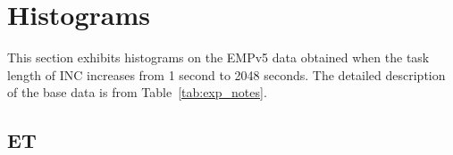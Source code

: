 \section{Histograms~\label{sec:sodb9_hist}} 
This section exhibits histograms on the EMPv5 data obtained when 
the task length of INC increases from 1 second to 2048 seconds. 
The detailed description of the base data is from Table~\ref{tab:exp_notes}.

\subsection{ET}

\begin{figure}[hp!]
	\centering
\end{figure}
